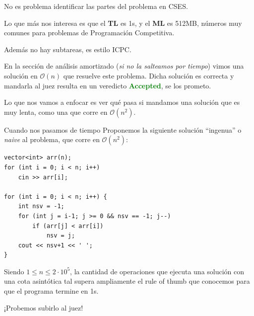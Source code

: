\documentclass{beamer}
\begin{document}
    \begin{frame}[noframenumbering]
        No es problema identificar las partes del problema en CSES. \pause 

        Lo que más nos interesa es que el \textbf{TL} es 1s, y el \textbf{ML} es 512MB, números muy comunes para problemas de Programación Competitiva. \pause 

        Además no hay subtareas, es estilo ICPC. \pause \vspace{4pt}

        En la sección de análisis amortizado (\textit{si no la salteamos por tiempo}) vimos una solución en $\mathcal{O}(n)$ que resuelve este problema. Dicha solución es correcta y mandarla al juez resulta en un veredicto \textbf{\textcolor{green}{Accepted}}, se los prometo. \pause

        Lo que nos vamos a enfocar es ver qué pasa si mandamos una solución que es muy lenta, como una que corre en $\mathcal{O}(n^2)$. 
    \end{frame}

    \begin{frame}[fragile]{Cuando nos pasamos de tiempo}
        Proponemos la siguiente solución ``ingenua'' o \textit{naive} al problema, que corre en $\mathcal{O}(n^2)$: \pause \vspace{4pt}
    
    \begin{verbatim}
vector<int> arr(n);
for (int i = 0; i < n; i++)
    cin >> arr[i];

for (int i = 0; i < n; i++) {
    int nsv = -1;
    for (int j = i-1; j >= 0 && nsv == -1; j--)
        if (arr[j] < arr[i])
            nsv = j;
    cout << nsv+1 << ' ';
}
    \end{verbatim}
    \pause

        Siendo $1 \leq n \leq 2 \cdot 10^5$, la cantidad de operaciones que ejecuta una solución con una cota asintótica tal supera ampliamente el rule of thumb que conocemos para que el programa termine en 1s. \pause

    \begin{center}
        \LARGE
        ¡Probemos subirlo al juez!
    \end{center}
    \end{frame}
\end{document}
